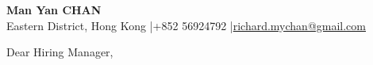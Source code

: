 \documentclass[11pt, a4paper]{article} %
\begin{document}
\begin{center} %
    {\Huge\bfseries Man Yan CHAN} \\ \vspace{1.5mm} %
    Eastern District, Hong Kong \quad|\quad +852 56924792 \quad|\quad \href{mailto:richard.mychan@gmail.com}{richard.mychan@gmail.com} \\
\end{center}
\vspace{2ex} %


\bigskip %

%

Dear Hiring Manager, %
\end{document}
